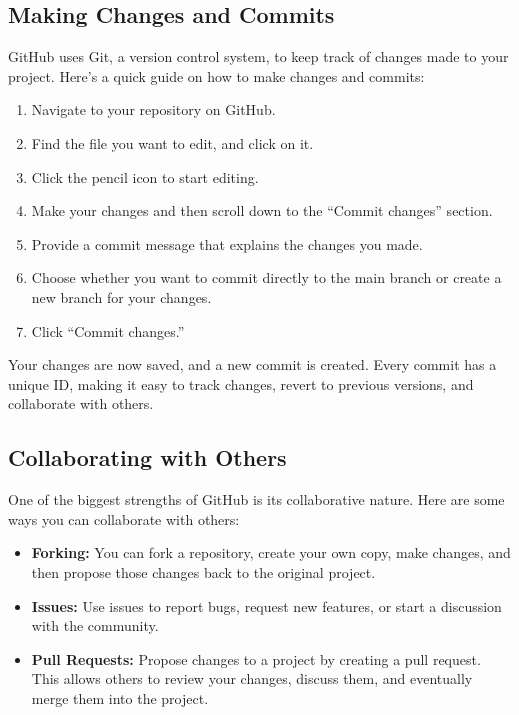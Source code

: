 \documentclass{book}
\begin{document}
\subsection*{Making Changes and Commits}

GitHub uses Git, a version control system, to keep track of changes made to your project. Here’s a quick guide on how to make changes and commits:

\begin{enumerate}
    \item Navigate to your repository on GitHub.
    \item Find the file you want to edit, and click on it.
    \item Click the pencil icon to start editing.
    \item Make your changes and then scroll down to the “Commit changes” section.
    \item Provide a commit message that explains the changes you made.
    \item Choose whether you want to commit directly to the main branch or create a new branch for your changes.
    \item Click “Commit changes.”
\end{enumerate}

Your changes are now saved, and a new commit is created. Every commit has a unique ID, making it easy to track changes, revert to previous versions, and collaborate with others.

\subsection*{Collaborating with Others}

One of the biggest strengths of GitHub is its collaborative nature. Here are some ways you can collaborate with others:

\begin{itemize}
    \item \textbf{Forking:} You can fork a repository, create your own copy, make changes, and then propose those changes back to the original project.
    \item \textbf{Issues:} Use issues to report bugs, request new features, or start a discussion with the community.
    \item \textbf{Pull Requests:} Propose changes to a project by creating a pull request. This allows others to review your changes, discuss them, and eventually merge them into the project.
\end{itemize}
\end{document}
